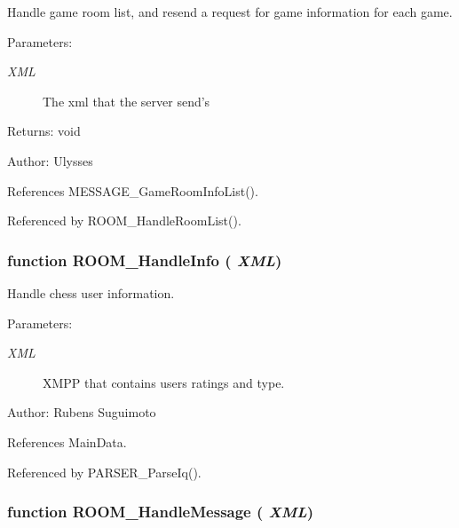 Handle game room list, and resend a request for game information for each game.

\begin{Desc}
\item[Parameters:]
\begin{description}
\item[{\em XML}]The xml that the server send's \end{description}
\end{Desc}
\begin{Desc}
\item[Returns:]void \end{Desc}
\begin{Desc}
\item[Author:]Ulysses \end{Desc}


References MESSAGE\_\-GameRoomInfoList().

Referenced by ROOM\_\-HandleRoomList().
\subsubsection{\setlength{\rightskip}{0pt plus 5cm}function ROOM\_\-HandleInfo ( {\em XML})}\label{room_2room_8js_b808dbbcc855d292d50a67bbdbeb5f8d}


Handle chess user information. \begin{Desc}
\item[Parameters:]
\begin{description}
\item[{\em XML}]XMPP that contains users ratings and type. \end{description}
\end{Desc}
\begin{Desc}
\item[Author:]Rubens Suguimoto \end{Desc}


References MainData.

Referenced by PARSER\_\-ParseIq().
\subsubsection{\setlength{\rightskip}{0pt plus 5cm}function ROOM\_\-HandleMessage ( {\em XML})}\label{room_2room_8js_b8e44c24ddafeaba9d1828af2e1ac279}



